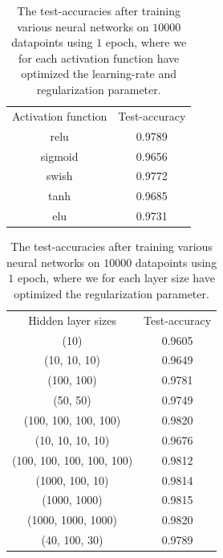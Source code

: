 \documentclass{article}
\begin{document}
\begin{table}
	\centering
	\begin{tabular}{| c | c |}
		Activation function & Test-accuracy \\
		relu                & 0.9789        \\
		sigmoid             & 0.9656        \\
		swish               & 0.9772        \\
		tanh                & 0.9685        \\
		elu                 & 0.9731
	\end{tabular}
	\caption{The test-accuracies after training various neural networks on
		$10 000$ datapoints using $1$ epoch, where we for each activation
		function have optimized the learning-rate and regularization parameter.}
	\label{nnactivres}
\end{table}
\begin{table}
	\centering
	\begin{tabular}{| c | c |}
		Hidden layer sizes        & Test-accuracy \\
		(10)                      & 0.9605        \\
		(10, 10, 10)              & 0.9649        \\
		(100, 100)                & 0.9781        \\
		(50, 50)                  & 0.9749        \\
		(100, 100, 100, 100)      & 0.9820        \\
		(10, 10, 10, 10)          & 0.9676        \\
		(100, 100, 100, 100, 100) & 0.9812        \\
		(1000, 100, 10)           & 0.9814        \\
		(1000, 1000)              & 0.9815        \\
		(1000, 1000, 1000)        & 0.9820        \\
		(40, 100, 30)             & 0.9789
	\end{tabular}
	\caption{The test-accuracies after training various neural networks on
		$10 000$ datapoints using $1$ epoch, where we for each layer
		size have optimized the regularization parameter.}
	\label{nnsizeres}
\end{table}
\end{document}
